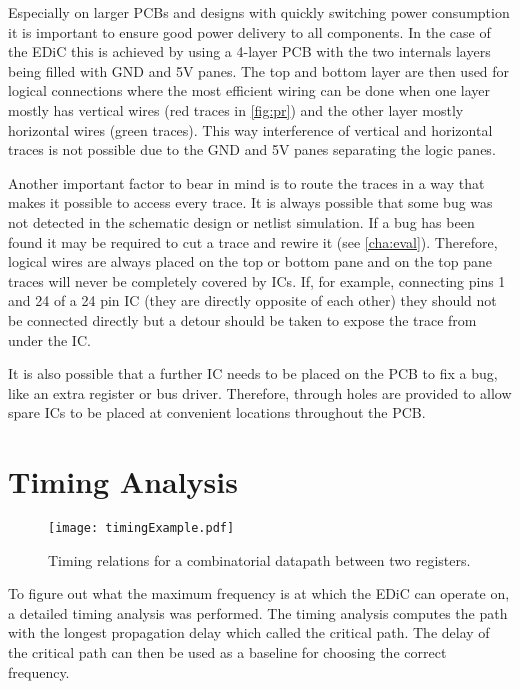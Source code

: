 Especially on larger \glspl{PCB} and designs with quickly switching power consumption it is important to ensure good power delivery to all components.
In the case of the \gls{EDiC} this is achieved by using a 4-layer \gls{PCB} with the two internals layers being filled with GND and 5V panes.
The top and bottom layer are then used for logical connections where the most efficient wiring can be done when one layer mostly has vertical wires (red traces in \cref{fig:pr}) and the other layer mostly horizontal wires (green traces).
This way interference of vertical and horizontal traces is not possible due to the GND and 5V panes separating the logic panes.

Another important factor to bear in mind is to route the traces in a way that makes it possible to access every trace.
It is always possible that some bug was not detected in the schematic design or netlist simulation.
If a bug has been found it may be required to cut a trace and rewire it (see \cref{cha:eval}).
Therefore, logical wires are always placed on the top or bottom pane and on the top pane traces will never be completely covered by \glspl{IC}.
If, for example, connecting pins 1 and 24 of a 24 pin \gls{IC} (they are directly opposite of each other) they should not be connected directly but a detour should be taken to expose the trace from under the \gls{IC}.

It is also possible that a further \gls{IC} needs to be placed on the \gls{PCB} to fix a bug, like an extra register or bus driver.
Therefore, through holes are provided to allow spare \glspl{IC} to be placed at convenient locations throughout the \gls{PCB}.

\section{Timing Analysis}\label{sec:timing}
\begin{figure}[t]
  \centering
  \texttt{[image: timingExample.pdf]}
  \caption{Timing relations for a combinatorial datapath between two registers.}
  \label{fig:timingExample}
\end{figure}
To figure out what the maximum frequency is at which the \gls{EDiC} can operate on, a detailed timing analysis was performed.
The timing analysis computes the path with the longest propagation delay which called the critical path.
The delay of the critical path can then be used as a baseline for choosing the correct frequency.

